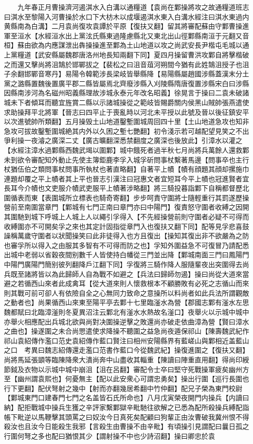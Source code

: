 　　九年春正月曹操濟河遏淇水入白溝以通糧道【袁尚在鄴操將攻之故通糧道班志曰淇水至黎陽入河曹操於水口下大枋木以成堰遏淇水東入白溝水經注曰淇水東過内黄縣南為白溝】二月袁尚復攻袁譚於平原【復扶又翻】留其將審配蘇由守鄴曹操進軍至洹水【水經洹水出上黨泫氏縣東過隆慮縣北又東北出山徑鄴縣南洹于元翻又音桓】蘇由欲為内應謀泄出犇操操進至鄴為土山地道以攻之尚武安長尹楷屯毛城以通上黨糧道【武安縣屬魏郡唐洛州地長知兩翻下同】夏四月操留曹洪攻鄴自將擊楷破之而還又擊尚將沮鵠於邯鄲拔之【裴松之曰沮音葅河朔間今猶有此姓鵠沮授子也沮子余翻邯鄲音寒丹】易陽令韓範涉長梁岐皆舉縣降【易陽縣屬趙國涉縣蓋漢末分土黨之潞縣置魏後置廣平郡二縣皆屬焉北齊廢涉縣入刈陵縣隋唐復置涉縣宋白曰涉縣因縣南涉河為名磁州昭義縣理故涉城永泰元年改名昭義】徐晃言于操曰二袁未破諸城未下者傾耳而聽宜旌賞二縣以示諸城操從之範岐皆賜爵關内侯黑山賊帥張燕遣使求助操拜平北將軍【晉志曰四平止于喪亂時以河北未平授以此號及晉以後征鎮安平以次進號帥所類翻】五月操毁土山地道鑿塹圍城周回四十里【土山地道急攻也知非急攻可拔故鑿塹圍城絶其内外以久困之塹七艷翻】初令淺示若可越配望見笑之不出爭利操一夜濬之廣深二丈【廣古曠翻深悉禁翻度之廣深也後放此】引漳水以灌之【水經注漳水過鄴縣西魏武堨以圍鄴】城中餓死者過半秋七月尚將兵萬餘人還救鄴未到欲令審配知外動止先使主簿鉅鹿李孚入城孚斫問事杖繫著馬邊【問事卒也主行杖猶伍伯之類問事杖問事所執杖也著直略翻】自著平上幘【幘有顔題其顔却摞施巾連題却覆之平上幘者其上平也晉志引漢注曰冠惠文者宜短耳今平上幘也冠進賢者宜長耳今介幘也文吏服介幘武吏服平上幘著涉略翻】將三騎投暮詣鄴下自稱都督歷北圍循表而東【表圍城所立標表也騎奇寄翻】步步呵責守圍將士隨輕重行其罰遂歷操營前至南圍當章門【鄴城有七門正南曰章門亦曰中陽門】復責怒守圍者收縛之因開其圍馳到城下呼城上人城上人以繩引孚得入【不先經操營前則守圍者必疑不可得而收縛圍亦不可開矣孚之來也其定計固指從章門入也復扶又翻下同】配等見孚悲喜鼓譟稱萬歲守圍者以狀聞操笑曰此非徒得入也方且復出【操知其復出非不欲嚴為之防也審孚所以得入之由服其多智有不可得而防之也】孚知外圍益急不可復冒乃請配悉出城中老弱以省穀夜間别數千人皆使持白幡從三門並出降【鄴城南面三門曰鳳陽門中陽門廣陽門簡别彼列翻降戶江翻下同】孚復將三騎作降人服隨輩夜出突圍得去尚兵既至諸將皆以為此歸師人自為戰不如避之【兵法曰歸師勿遏】操曰尚從大道來當避之若循西山來者此成禽耳【從大道來則人懷救根本不顧勝敗有必死之志循山而來則其戰可前可卻人有依險自全之心無同力致命之意操所以料尚者如此兵法所謂觀敵之動者也】尚果循西山來東至陽平亭去鄴十七里臨滏水為營【郡國志鄴有滏水左思魏都賦曰北臨漳滏則冬夏異沼注云鄴北有滏水水熱故名滏口】夜舉火以示城中城中亦舉火相應配出兵城北欲與尚對决圍操逆擊之敗還尚亦破走依曲漳為營【賢曰漳水之曲也】操遂圍之未合尚愳遣使求降操不聽圍之益急尚夜遁保祁山【陳壽魏武紀作祁山袁紹傳作濫口范史袁紹傳作藍口賢注曰相州安陽縣界有藍嵯山與鄴相近盖藍山之口　考異曰魏志紹傳還走濫口范書作藍口今從魏武紀】操復進圍之【復扶又翻】尚將馬延張顗等臨陳降衆大潰尚奔中山盡收其輜重【陳讀曰陣重直用翻】得尚印綬節鉞及衣物以示城中城中崩沮【沮在呂翻】審配令士卒曰堅守死戰操軍疲矣幽州方至【幽州謂袁熙也】何憂無主【配以此安衆心可謂忠勇矣】操出行圍【巡行長圍也行下更翻】配伏弩射之幾中【射而亦翻幾居希翻中竹仲翻】配兄子榮為東門校尉【鄴城東門口建春門七門之名盖皆石氏所命也】八月戊寅榮夜開門内操兵【内讀曰納】配拒戰城中操兵生獲之辛評家繫鄴獄辛毗馳往欲解之已悉為配所殺操兵縛配詣帳下毗逆以馬鞭擊其頭罵之曰奴汝今日真死矣配顧曰狗輩正由汝曹破我冀州恨不得殺汝也且汝今日能殺生我邪【言殺生由曹操不由辛毗】有頃操引見謂配曰曩日孤之行圍何弩之多也配曰猶恨其少【謂射操不中也少詩沼翻】操曰卿忠於袁